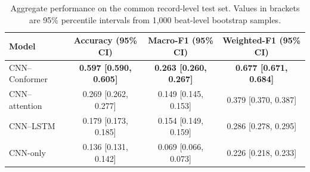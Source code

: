 \begin{table}[t]
  \centering
  \caption{Aggregate performance on the common record-level test set. Values in brackets are 95\% percentile intervals from 1{,}000 beat-level bootstrap samples.}
  \label{tab:test-metrics}
  \begin{tabular}{lccc}
    \toprule
    Model & Accuracy (95\% CI) & Macro-F1 (95\% CI) & Weighted-F1 (95\% CI) \\
    \midrule
    CNN--Conformer & \textbf{0.597 [0.590, 0.605]} & \textbf{0.263 [0.260, 0.267]} & \textbf{0.677 [0.671, 0.684]} \\
    CNN--attention & 0.269 [0.262, 0.277] & 0.149 [0.145, 0.153] & 0.379 [0.370, 0.387] \\
    CNN--LSTM & 0.179 [0.173, 0.185] & 0.154 [0.149, 0.159] & 0.286 [0.278, 0.295] \\
    CNN-only & 0.136 [0.131, 0.142] & 0.069 [0.066, 0.073] & 0.226 [0.218, 0.233] \\
    \bottomrule
  \end{tabular}
\end{table}
